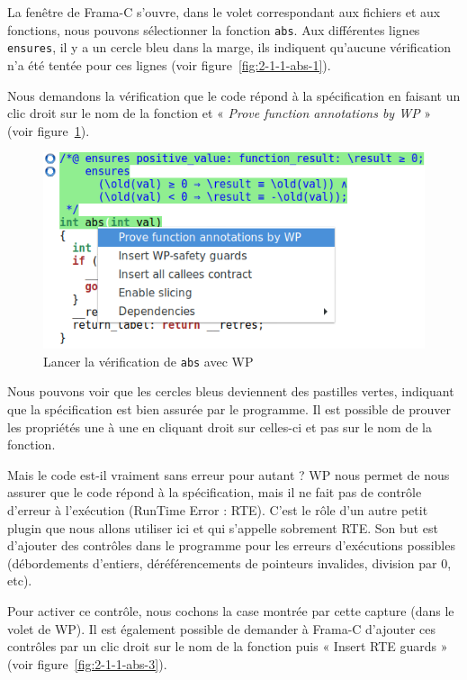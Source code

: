 \documentclass[12pt,francais,]{scrbook}
\begin{document}
La fenêtre de Frama-C s'ouvre, dans le volet correspondant aux fichiers
et aux fonctions, nous pouvons sélectionner la fonction \texttt{abs}.
Aux différentes lignes \texttt{ensures}, il y a un cercle bleu dans la
marge, ils indiquent qu'aucune vérification n'a été tentée pour ces
lignes (voir figure~\ref{fig:2-1-1-abs-1}).

Nous demandons la vérification que le code répond à la spécification en
faisant un clic droit sur le nom de la fonction et « \emph{Prove
function annotations by WP} » (voir figure~\ref{fig:2-1-1-abs-2}).

\begin{figure}[htbp]
\centering
\includegraphics[scale=0.5]{2-1-1-abs-2.png}
\caption{Lancer la vérification de \texttt{abs} avec WP}
\label{fig:2-1-1-abs-2}
\end{figure}

Nous pouvons voir que les cercles bleus deviennent des pastilles vertes,
indiquant que la spécification est bien assurée par le programme. Il est
possible de prouver les propriétés une à une en cliquant droit sur
celles-ci et pas sur le nom de la fonction.

Mais le code est-il vraiment sans erreur pour autant ? WP nous permet de
nous assurer que le code répond à la spécification, mais il ne fait pas
de contrôle d'erreur à l'exécution (RunTime Error : RTE). C'est le rôle
d'un autre petit plugin que nous allons utiliser ici et qui s'appelle
sobrement RTE. Son but est d'ajouter des contrôles dans le programme
pour les erreurs d'exécutions possibles (débordements d'entiers,
déréférencements de pointeurs invalides, division par 0, etc).

Pour activer ce contrôle, nous cochons la case montrée par cette capture
(dans le volet de WP). Il est également possible de demander à Frama-C
d'ajouter ces contrôles par un clic droit sur le nom de la fonction puis
« Insert RTE guards » (voir figure~\ref{fig:2-1-1-abs-3}).
\end{document}
